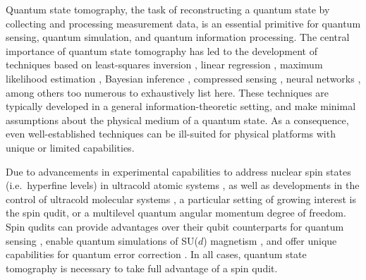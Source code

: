 \documentclass[a4paper,twocolumn,unpublished]{quantumarticle}
\begin{document}
Quantum state tomography, the task of reconstructing a quantum state by collecting and processing measurement data, is an essential primitive for quantum sensing, quantum simulation, and quantum information processing.
The central importance of quantum state tomography has led to the development of techniques based on least-squares inversion \cite{opatrny1997leastsquares}, linear regression \cite{qi2013quantum}, maximum likelihood estimation \cite{teo2011quantumstate, smolin2012efficient}, Bayesian inference \cite{huszar2012adaptive, ferrie2014quantum, granade2016practical}, compressed sensing \cite{gross2010quantum, kalev2015quantum}, neural networks \cite{torlai2018neuralnetwork}, among others too numerous to exhaustively list here. %
These techniques are typically developed in a general information-theoretic setting, and make minimal assumptions about the physical medium of a quantum state.
As a consequence, even well-established techniques can be ill-suited for physical platforms with unique or limited capabilities.

Due to advancements in experimental capabilities to address nuclear spin states (i.e.~hyperfine levels) in ultracold atomic systems \cite{daley2011quantum, mischuck2012control, smith2013quantum, cazalilla2014ultracold}, as well as developments in the control of ultracold molecular systems \cite{bohn2017cold, zeppenfeld2012sisyphus, kozyryev2017sisyphus, puri2017synthesis, wu2017cryofuge, marco2019degenerate, liu2019molecular, anderegg2019optical, chou2020frequencycomb, lin2020quantum}, a particular setting of growing interest is the spin qudit, or a multilevel quantum angular momentum degree of freedom.
Spin qudits can provide advantages over their qubit counterparts for quantum sensing \cite{hemmer2018squeezing, evrard2019enhanced}, enable quantum simulations of SU($d$) magnetism \cite{cazalilla2014ultracold, banerjee2013atomic, zhang2014spectroscopic, scazza2014observation, goban2018emergence}, and offer unique capabilities for quantum error correction \cite{albert2020robust, gross2020encoding}.
In all cases, quantum state tomography is necessary to take full advantage of a spin qudit.

\end{document}

